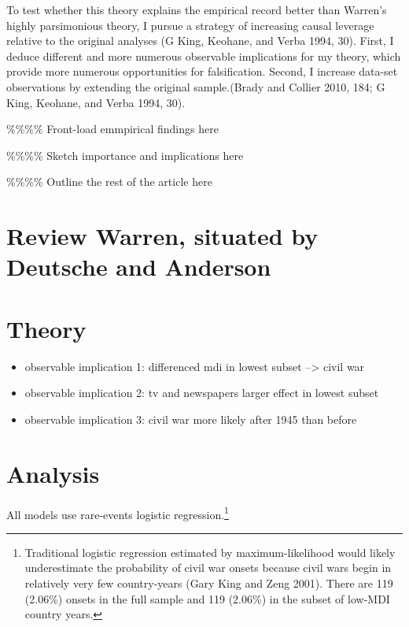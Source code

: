 \documentclass[11pt,article,oneside]{memoir}
\begin{document}
To test whether this theory explains the empirical record better than
Warren's highly parsimonious theory, I pursue a strategy of increasing
causal leverage relative to the original analyses (G King, Keohane, and
Verba 1994, 30). First, I deduce different and more numerous observable
implications for my theory, which provide more numerous opportunities
for falsification. Second, I increase data-set observations by extending
the original sample.(Brady and Collier 2010, 184; G King, Keohane, and
Verba 1994, 30).

\%\%\%\% Front-load emmpirical findings here

\%\%\%\% Sketch importance and implications here

\%\%\%\% Outline the rest of the article here

\section{Review Warren, situated by Deutsche and
Anderson}\label{review-warren-situated-by-deutsche-and-anderson}

\section{Theory}\label{theory}

\begin{itemize}
\itemsep1pt\parskip0pt
\item
  observable implication 1: differenced mdi in lowest subset
  --\textgreater{} civil war
\item
  observable implication 2: tv and newspapers larger effect in lowest
  subset
\item
  observable implication 3: civil war more likely after 1945 than before
\end{itemize}

\section{Analysis}\label{analysis}

All models use rare-events logistic regression.\footnote{Traditional
  logistic regression estimated by maximum-likelihood would likely
  underestimate the probability of civil war onsets because civil wars
  begin in relatively very few country-years (Gary King and Zeng 2001).
  There are 119 (2.06\%) onsets in the full sample and 119 (2.06\%) in
  the subset of low-MDI country years.}
\end{document}
